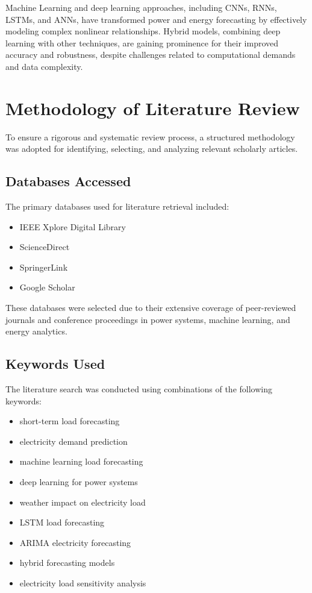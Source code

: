 \documentclass[conference]{IEEEtran}
\begin{document}
Machine Learning and deep learning approaches, including CNNs, RNNs, LSTMs, and ANNs, have transformed power and energy forecasting by effectively modeling complex nonlinear relationships. Hybrid models, combining deep learning with other techniques, are gaining prominence for their improved accuracy and robustness, despite challenges related to computational demands and data complexity.





\section{Methodology of Literature Review}

To ensure a rigorous and systematic review process, a structured methodology was adopted for identifying, selecting, and analyzing relevant scholarly articles.

\subsection{Databases Accessed}

The primary databases used for literature retrieval included:

\begin{itemize}
    \item IEEE Xplore Digital Library
    \item ScienceDirect
    \item SpringerLink
    \item Google Scholar
\end{itemize}

These databases were selected due to their extensive coverage of peer-reviewed journals and conference proceedings in power systems, machine learning, and energy analytics.

\subsection{Keywords Used}

The literature search was conducted using combinations of the following keywords:

\begin{itemize}
    \item short-term load forecasting
    \item electricity demand prediction
    \item machine learning load forecasting
    \item deep learning for power systems
    \item weather impact on electricity load
    \item LSTM load forecasting
    \item ARIMA electricity forecasting
    \item hybrid forecasting models
    \item electricity load sensitivity analysis
\end{itemize}
\end{document}
